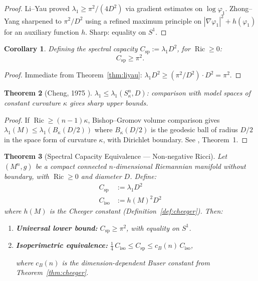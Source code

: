 \documentclass[11pt]{article}
\newtheorem{theorem}{Theorem}[section]
\newtheorem{corollary}[theorem]{Corollary}
\theoremstyle{definition}
\theoremstyle{remark}
\newcommand{\Ric}{\operatorname{Ric}}
\newcommand{\Csp}{C_{\mathrm{sp}}}
\begin{document}
\begin{proof}
Li--Yau \cite{LiYau} proved $\lambda_1 \ge \pi^2/(4D^2)$ via gradient estimates on $\log\varphi_1$. Zhong--Yang sharpened to $\pi^2/D^2$ using a refined maximum principle on $|\nabla\varphi_1|^2 + h(\varphi_1)$ for an auxiliary function $h$. Sharp: equality on $S^1$.
\end{proof}

\begin{corollary}\label{cor:capacity_lower}
Defining the spectral capacity $\Csp := \lambda_1 D^2$, for $\Ric \ge 0$:
\[
\Csp \ge \pi^2.
\]
\end{corollary}

\begin{proof}
Immediate from Theorem~\ref{thm:liyau}: $\lambda_1 D^2 \ge (\pi^2/D^2)\cdot D^2 = \pi^2$.
\end{proof}

\begin{theorem}[Cheng, 1975 {\cite{Cheng}}]\label{thm:cheng}
$\lambda_1 \le \lambda_1(S^n_\kappa, D)$: comparison with model spaces of constant curvature $\kappa$ gives sharp upper bounds.
\end{theorem}

\begin{proof}
If $\Ric \ge (n-1)\kappa$, Bishop--Gromov volume comparison gives $\lambda_1(M) \le \lambda_1(B_\kappa(D/2))$ where $B_\kappa(D/2)$ is the geodesic ball of radius $D/2$ in the space form of curvature $\kappa$, with Dirichlet boundary. See \cite{Cheng}, Theorem~1.
\end{proof}

\begin{theorem}[Spectral Capacity Equivalence --- Non-negative Ricci]\label{thm:SCE}
Let $(M^n, g)$ be a compact connected $n$-dimensional Riemannian manifold without boundary, with $\Ric \ge 0$ and diameter $D$. Define:
\begin{align}
\Csp &:= \lambda_1 D^2 \tag{spectral capacity} \\
C_{\mathrm{iso}} &:= h(M)^2 D^2 \tag{isoperimetric capacity}
\end{align}
where $h(M)$ is the Cheeger constant (Definition~\ref{def:cheeger}). Then:
\begin{enumerate}[nosep, label=(\alph*)]
\item \textbf{Universal lower bound:} $\Csp \ge \pi^2$, with equality on $S^1$.
\item \textbf{Isoperimetric equivalence:} $\tfrac{1}{4}\,C_{\mathrm{iso}} \le \Csp \le c_B(n)\,C_{\mathrm{iso}}$,

where $c_B(n)$ is the dimension-dependent Buser constant from Theorem~\ref{thm:cheeger}.
\end{enumerate}
\end{theorem}
\end{document}
